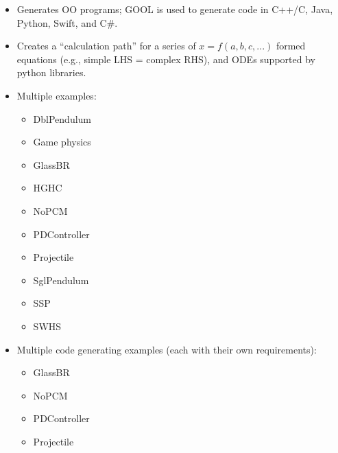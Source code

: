 \begin{itemize}
    \item Generates OO programs; GOOL is used to generate code in C++/C, Java,
          Python, Swift, and C\#.
    \item Creates a ``calculation path'' for a series of $x = f(a,b,c,...)$
          formed equations (e.g., simple LHS = complex RHS), and ODEs supported
          by python libraries.
    \item Multiple examples:
          \begin{itemize}
              \item DblPendulum
              \item Game physics
              \item GlassBR
              \item HGHC
              \item NoPCM
              \item PDController
              \item Projectile
              \item SglPendulum
              \item SSP
              \item SWHS
          \end{itemize}
    \item Multiple code generating examples (each with their own requirements):
          \begin{itemize}
              \item GlassBR
              \item NoPCM
              \item PDController
              \item Projectile
          \end{itemize}
\end{itemize}

